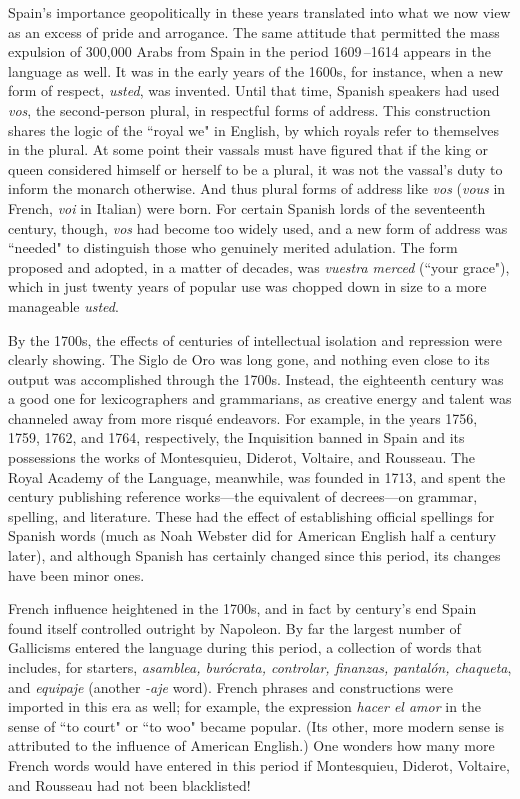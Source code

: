 Spain's importance geopolitically in these years translated into
what we now view as an excess of pride and arrogance. The same attitude that permitted the mass expulsion of 300,000 Arabs from Spain
in the period 1609\,--1614 appears in the language as well. It was in
the early years of the 1600s, for instance, when a new form of respect,
\emph{usted}, was invented. Until that time, Spanish speakers had used \emph{vos},
the second-person plural, in respectful forms of address. This construction shares the logic of the ``royal we" in English, by which royals refer to themselves in the plural. At some point their vassals must have
figured that if the king or queen considered himself or herself to be a
plural, it was not the vassal's duty to inform the monarch otherwise.
And thus plural forms of address like \emph{vos} (\emph{vous} in French, \emph{voi} in Italian) were born. For certain Spanish lords of the seventeenth century,
though, \emph{vos} had become too widely used, and a new form of address
was ``needed" to distinguish those who genuinely merited adulation.
The form proposed and adopted, in a matter of decades, was \emph{vuestra
merced} (``your grace"), which in just twenty years of popular use was
chopped down in size to a more manageable \emph{usted}.

By the 1700s, the effects of centuries of intellectual isolation
and repression were clearly showing. The Siglo de Oro was long gone,
and nothing even close to its output was accomplished through the
1700s. Instead, the eighteenth century was a good one for lexicographers and grammarians, as creative energy and talent was channeled
away from more risqué endeavors. For example, in the years 1756,
1759, 1762, and 1764, respectively, the Inquisition banned in Spain and
its possessions the works of Montesquieu, Diderot, Voltaire, and Rousseau. The Royal Academy of the Language, meanwhile, was founded in
1713, and spent the century publishing reference works---the equivalent of decrees---on grammar, spelling, and literature. These had the
effect of establishing official spellings for Spanish words (much as
Noah Webster did for American English half a century later), and although Spanish has certainly changed since this period, its changes
have been minor ones.

French influence heightened in the 1700s, and in fact by century's end Spain found itself controlled outright by Napoleon. By far
the largest number of Gallicisms entered the language during this period, a collection of words that includes, for starters, \emph{asamblea, burócrata, controlar, finanzas, pantalón, chaqueta}, and \emph{equipaje} (another
\emph{-aje} word). French phrases and constructions were imported in this era
as well; for example, the expression \emph{hacer el amor} in the sense of ``to
court" or ``to woo" became popular. (Its other, more modern sense is
attributed to the influence of American English.) One wonders how
many more French words would have entered in this period if Montesquieu, Diderot, Voltaire, and Rousseau had not been blacklisted!

